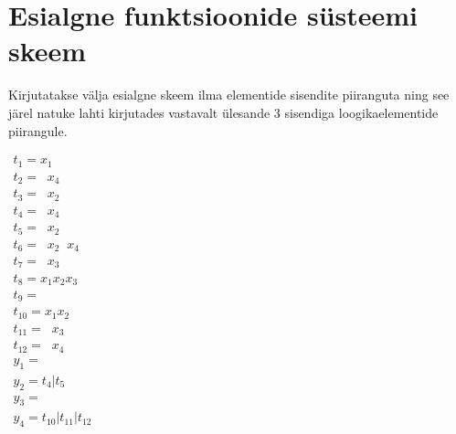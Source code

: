 \section{Esialgne funktsioonide süsteemi skeem}
Kirjutatakse välja esialgne skeem ilma elementide sisendite piiranguta ning see järel
natuke lahti kirjutades vastavalt ülesande 3 sisendiga loogikaelementide piirangule.

\newcommand\bnot[1]{\mathop{\overline{#1}}}
\newcommand\nand[0]{\bnot{\wedge}}
\newcommand\nor[0]{\bnot{\vee}}

\begin{multicols}{2}
\(\begin{array}{l}
t_1 = x_1 \bnot{x_2} \\
t_2 = \bnot{x_3 } x_4 \\
t_3 = \bnot{x_1} x_2 \\
t_4 = \bnot{x_2} x_4 \\
t_5 = \bnot{x_1} x_2 \\
t_6 = \bnot{x_1} x_2 \bnot{x_3} x_4 \\
t_7 = \bnot{x_1} x_3 \bnot{x_4} \\ 
t_8 = x_1 x_2 x_3 \\
t_9 = \bnot{x_2} \bnot{x_3} \bnot{x_4} \\
t_{10} = x_1 x_2 \bnot{x_3} \bnot{x_4} \\
t_{11} = \bnot{x_1} x_3 \\
t_{12} = \bnot{x_2} x_4 \\
y_1 = \bnot{t_1 | t_2 | t_3} \\
y_2 = t_4 | t_5 \\ 
y_3 = \bnot{t_6 | t_7 | t_8 | t_9} \\
y_4 = t_{10} | t_{11} | t_{12} \\
\end{array}\)

\columnbreak


\end{multicols}
